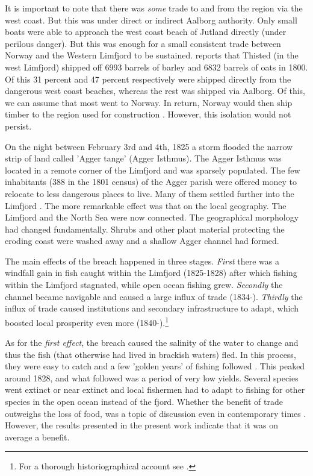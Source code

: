 \documentclass[11pt]{article}
\begin{document}
It is important to note that there was \textit{some} trade to and from the region via the west coast. But this was under direct or indirect Aalborg authority. Only small boats were able to approach the west coast beach of Jutland directly (under perilous danger). But this was enough for a small consistent trade between Norway and the Western Limfjord to be sustained. \cite[p. 30]{Aagard1802} reports that Thisted (in the west Limfjord) shipped off 6993 barrels of barley and 6832 barrels of oats in 1800. Of this 31 percent and 47 percent respectively were shipped directly from the dangerous west coast beaches, whereas the rest was shipped via Aalborg. Of this, we can assume that most went to Norway. In return, Norway would then ship timber to the region used for construction \citep[p. 234]{Christensen1735}. However, this isolation would not persist.

On the night between February 3rd and 4th, 1825 a storm flooded the narrow strip of land called 'Agger tange' (Agger Isthmus). The Agger Isthmus was located in a remote corner of the Limfjord and was sparsely populated. The few inhabitants (388 in the 1801 census) of the Agger parish were offered money to relocate to less dangerous places to live. Many of them settled further into the Limfjord \citep{Poulsen2019, Poulsen2022}. The more remarkable effect was that on the local geography. The Limfjord and the North Sea were now connected. The geographical morphology had changed fundamentally. Shrubs and other plant material protecting the eroding coast were washed away and a shallow Agger channel had formed.

The main effects of the breach happened in three stages. \textit{First} there was a windfall gain in fish caught within the Limfjord (1825-1828) after which fishing within the Limfjord stagnated, while open ocean fishing grew. \textit{Secondly} the channel became navigable and caused a large influx of trade (1834-). \textit{Thirdly} the influx of trade caused institutions and secondary infrastructure to adapt, which boosted local prosperity even more (1840-).\footnote{For a thorough historiographical account see \cite{Poulsen2022}.}

As for the \textit{first effect}, the breach caused the salinity of the water to change and thus the fish (that otherwise had lived in brackish waters) fled. In this process, they were easy to catch and a few 'golden years' of fishing followed \citep{Poulsen2007}. This peaked around 1828, and what followed was a period of very low yields. Several species went extinct or near extinct \citep{Poulsen2019} and local fishermen had to adapt to fishing for other species in the open ocean instead of the fjord. Whether the benefit of trade outweighs the loss of food, was a topic of discussion even in contemporary times \citep[p. 1]{petersen1853oplysende}. However, the results presented in the present work indicate that it was on average a benefit.
\end{document}

